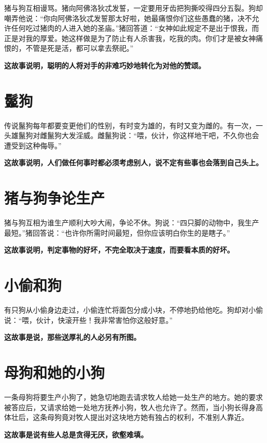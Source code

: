 猪与狗互相谩骂。猪向阿佛洛狄忒发誓，一定要用牙齿把狗撕咬得四分五裂。狗却嘲弄他说：“你向阿佛洛狄忒发誓那太好啦，她最痛恨你们这些愚蠢的猪，决不允许任何吃过猪肉的人进入她的圣庙。”猪回答道：“女神如此规定不是出于恨我，而正是对我的厚爱。她这样做是为了防止有人杀害我，吃我的肉。你们才是被女神痛恨的，不管是死是活，都可以拿去祭祀。”

{\bfseries \color{red}这故事说明，聪明的人将对手的非难巧妙地转化为对他的赞颂。}

\section{鬣狗}

传说鬣狗每年都要变更他们的性别，有时变为雄的，有时又变为雌的。有一次，一头雄鬣狗对雌鬣狗大发淫威。雌鬣狗说：“喂，伙计，你这样地干吧，不久你也会遭受到这种侮辱。”

{\bfseries \color{red}这故事说明，人们做任何事时都必须考虑别人，说不定有些事也会落到自己头上。}

\section{猪与狗争论生产}

猪与狗互相为谁生产顺利大吵大闹，争论不休。狗说：“四只脚的动物中，我生产最短。”猪回答说：“也许你所需时间最短，但你应该明白你生的是瞎子。”

{\bfseries \color{red}这故事说明，判定事物的好坏，不完全取决于速度，而要看本质的好坏。}

\section{小偷和狗}

有只狗从小偷身边走过，小偷连忙将面包分成小块，不停地扔给他吃。狗却对小偷说：“喂，伙计，快滚开些！我非常害怕你这般好意。”

{\bfseries \color{red}这故事是说，那些送厚礼的人必另有所图。}

\section{母狗和她的小狗}

一条母狗将要生产小狗了，她急切地跑去请求牧人给她一处生产的地方。她的要求被答应后，又请求给她一处地方抚养小狗，牧人也允许了。然而，当小狗长得身高体壮后，这条母狗竟对牧人提出对这块地方她有独占的权利，不准别人靠近。

{\bfseries \color{red}这故事是说有些人总是贪得无厌，欲壑难填。}

